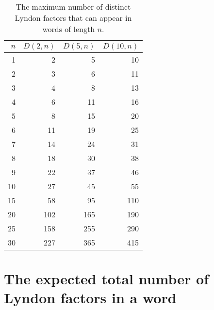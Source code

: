 \documentclass[11pt]{amsart}
\newcommand{\1}{\bar{1}}
\theoremstyle{plain}
\theoremstyle{definition}
\theoremstyle{remark}
\begin{document}
  \begin{table}[htb!]
 \centering
 \begin{tabular}{rrrr}
 \hline
 $n$ & $D(2,n)$  &  $D(5,n)$ & $D(10,n)$ \\
 \hline
 1  &      2  &     5  &    10\\
   2  &      3  &     6  &    11\\
   3  &      4  &     8  &    13\\
   4  &      6  &    11  &    16\\
   5  &      8  &    15  &    20\\
   6  &     11  &    19  &    25\\
   7  &     14  &    24  &    31\\
   8  &     18  &    30  &    38\\
   9  &     22  &    37  &    46\\
  10  &     27  &    45  &    55\\
  15  &     58  &    95  &   110\\
  20  &    102  &   165  &   190\\
  25  &    158  &   255  &   290\\
  30  &    227  &   365  &   415\\

\end{tabular}
\caption{\label{table1} {\small The maximum number of distinct  Lyndon factors that can appear in words of length $n$.}}
  \end{table}


\section{The expected total number of Lyndon factors in a word}
\label{sect-3}
\end{document}
